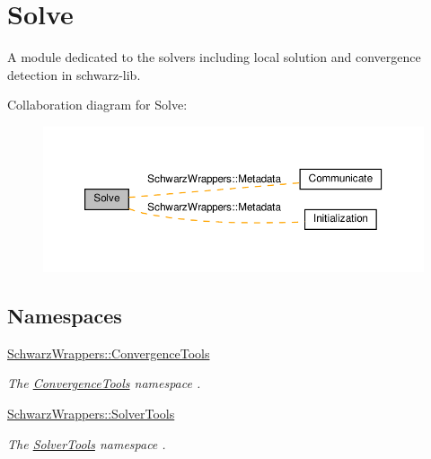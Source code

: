 \hypertarget{group__solve}{}\section{Solve}
\label{group__solve}


A module dedicated to the solvers including local solution and convergence detection in schwarz-\/lib.  


Collaboration diagram for Solve\+:
\nopagebreak
\begin{figure}[H]
\begin{center}
\leavevmode
\includegraphics[width=350pt]{group__solve}
\end{center}
\end{figure}
\subsection*{Namespaces}
\begin{DoxyCompactItemize}
\item 
 \hyperlink{namespaceSchwarzWrappers_1_1ConvergenceTools}{Schwarz\+Wrappers\+::\+Convergence\+Tools}
\begin{DoxyCompactList}\small\item\em The \hyperlink{namespaceSchwarzWrappers_1_1ConvergenceTools}{Convergence\+Tools} namespace . \end{DoxyCompactList}\item 
 \hyperlink{namespaceSchwarzWrappers_1_1SolverTools}{Schwarz\+Wrappers\+::\+Solver\+Tools}
\begin{DoxyCompactList}\small\item\em The \hyperlink{namespaceSchwarzWrappers_1_1SolverTools}{Solver\+Tools} namespace . \end{DoxyCompactList}\end{DoxyCompactItemize}
